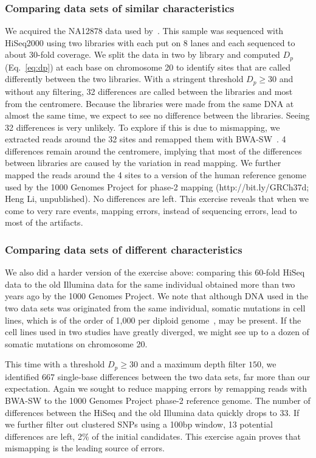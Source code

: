 \documentclass{bioinfo}
\begin{document}
\subsubsection{Comparing data sets of similar characteristics}
We acquired the NA12878 data used by~\citet{Depristo:2011vn}. This sample was sequenced
with HiSeq2000 using two libraries with each put on 8 lanes and each sequenced
to about 30-fold coverage.  We split the data in two by library and computed
$D_p$ (Eq.~\ref{eq:dp}) at each base on chromosome 20 to identify sites that
are called differently between the two libraries.  With a stringent threshold
$D_p\ge 30$ and without any filtering, 32 differences are called between
the libraries and most from the centromere. Because the libraries were made
from the same DNA at almost the same time, we expect to see no difference
between the libraries. Seeing 32 differences is very unlikely. To explore if
this is due to mismapping, we extracted reads around the 32 sites and remapped
them with BWA-SW~\citep{Li:2010fk}. 4 differences remain around the centromere,
implying that most of the differences between libraries are caused by the
variation in read mapping.  We further mapped the reads around the 4 sites to a
version of the human reference genome used by the 1000 Genomes Project for
phase-2 mapping (http://bit.ly/GRCh37d; Heng Li, unpublished).  No differences
are left. This exercise reveals that when we come to very rare events,
mapping errors, instead of sequencing errors, lead to most of the artifacts.

\subsubsection{Comparing data sets of different characteristics}
We also did a harder version of the exercise above: comparing this 60-fold
HiSeq data to the old Illumina data for the same individual obtained more than
two years ago by the 1000 Genomes Project. We note that although DNA used in
the two data sets was originated from the same individual, somatic mutations in
cell lines, which is of the order of 1,000 per diploid
genome~\citep{Conrad:2011kx}, may be present. If the cell lines used in two
studies have greatly diverged, we might see up to a dozen of somatic mutations
on chromosome 20.

This time with a threshold $D_p\ge 30$ and a maximum depth filter $150$, we
identified 667 single-base differences between the two data sets, far more than
our expectation. Again we sought to reduce mapping errors by remapping reads
with BWA-SW to the 1000 Genomes Project phase-2 reference genome. The number of
differences between the HiSeq and the old Illumina data quickly drops to 33.
If we further filter out clustered SNPs using a 100bp window, 13 potential differences
are left, 2\% of the initial candidates. This exercise again proves that
mismapping is the leading source of errors.
\end{document}

